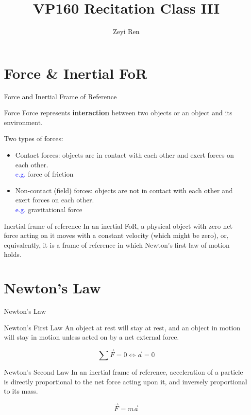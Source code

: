 \documentclass{beamer}
\title{VP160 Recitation Class III}
\author{Zeyi Ren}
\institute{UM-SJTU Joint Institute}
\begin{document}
\maketitle

\frame{\tableofcontents}

\section{Force \& Inertial FoR}
\begin{frame}{Force and Inertial Frame of Reference}
  \begin{block}{Force}
    Force represents \textbf{interaction} between two objects or an object and its environment. 
  \end{block}
  Two types of forces:\\
  \begin{itemize}
    \item Contact forces: objects are in contact with each other and exert forces on each other.\\ \textcolor{blue}{e.g.} force of friction
    \item Non-contact (field) forces: objects are not in contact with each other and exert forces on each other.\\ \textcolor{blue}{e.g.} gravitational force
  \end{itemize}
\end{frame}

\begin{frame}
  \begin{block}{Inertial frame of reference}
     In an inertial FoR, a physical object with zero net force acting on it moves with a constant velocity (which might be zero), or, equivalently, it is a frame of reference in which Newton's first law of motion holds.
  \end{block}
\end{frame}

\section{Newton's Law}
\begin{frame}{Newton's Law}
  \begin{block}{Newton's First Law}
    An object at rest will stay at rest, and an object in motion will stay in motion unless acted on by a net external force.
  \end{block}
  $$
  \sum{\vec{F}} = 0 \Leftrightarrow \vec{a} = 0
  $$

  \begin{block}{Newton's Second Law}
    In an inertial frame of reference, acceleration of a particle is directly proportional to the net force acting upon it, and inversely proportional to its mass.
  \end{block}
  $$
  \vec{F} = m\vec{a}
  $$
\end{frame}
\end{document}
